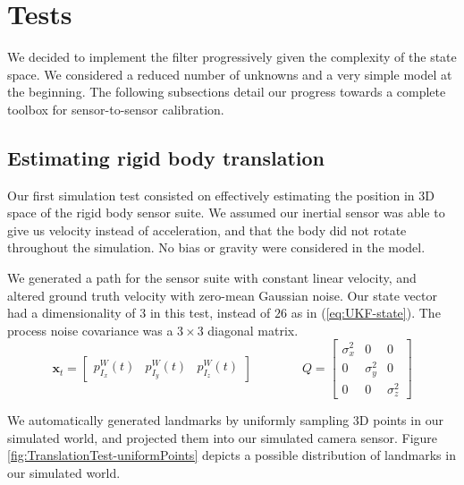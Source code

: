 \documentclass[letterpaper]{article}
\newcommand{\bb}[1]{\mathbf{#1}}
\begin{document}
\section{Tests}

We decided to implement the filter progressively given the complexity
of the state space. We considered a reduced number of unknowns and a
very simple model at the beginning. The following subsections detail
our progress towards a complete toolbox for sensor-to-sensor
calibration.

\subsection{Estimating rigid body translation}

Our first simulation test consisted on effectively estimating the
position in 3D space of the rigid body sensor suite. We assumed our
inertial sensor was able to give us velocity instead of acceleration,
and that the body did not rotate throughout the simulation. No bias
or gravity were considered in the model.

We generated a path for the sensor suite with constant linear
velocity, and altered ground truth velocity with zero-mean Gaussian
noise. Our state vector had a dimensionality of $3$ in this test,
instead of $26$ as in (\ref{eq:UKF-state}). The process noise
covariance was a $3 \times 3$ diagonal matrix.
\begin{equation}
\bb{x}_t=\begin{bmatrix} p_{I_x}^W(t) & p_{I_y}^W(t) & p_{I_z}^W(t) \end{bmatrix} 
\hspace{4em}
Q = \begin{bmatrix} 
\sigma_x^2 & 0 & 0\\ 
0 & \sigma_y^2 & 0\\ 
0 & 0 & \sigma_z^2
\end{bmatrix} 
\label{eq:TranslationTest-stateVec}
\end{equation}

We automatically generated landmarks by uniformly sampling 3D points
in our simulated world, and projected them into our simulated camera
sensor. Figure \ref{fig:TranslationTest-uniformPoints} depicts a
possible distribution of landmarks in our simulated world.
\end{document}
